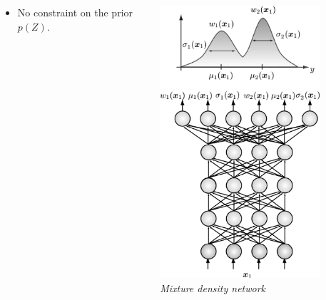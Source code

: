 \documentclass{beamer}
\begin{document}
\begin{frame}
\begin{columns}
\begin{column}{0.6\textwidth}
\begin{itemize}
                \item No constraint on the prior $p(Z)$.
            \end{itemize}
        \end{column}
        \begin{column}{0.5\textwidth}
            \begin{center}
                \includegraphics[width=0.8\textwidth]{figures/mdn.jpg}\\
                {\it Mixture density network}
            \end{center}
        \end{column}
    \end{columns}
\end{frame}


\end{document}
